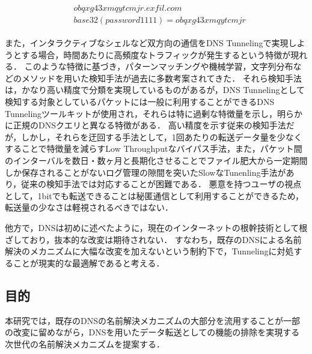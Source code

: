 \documentclass[12pt]{jarticle} %
\begin{document}
\begin{eqnarray}
 \label{eq:sample_qname}
 \begin{aligned}
  &obqxg43xmqytcmjr.exfil.com\\
  &base32(password1111) = obqxg43xmqytcmjr
 \end{aligned}
\end{eqnarray}

また，インタラクティブなシェルなど双方向の通信をDNS Tunnelingで実現しようとする場合，時間あたりに高頻度なトラフィックが発生するという特徴が現れる．
このような特徴に基づき，パターンマッチングや機械学習，文字列分布などのメソッドを用いた検知手法が過去に多数考案されてきた\cite{born, cheng, liu, asaf, steadman, jawad}．
それら検知手法は，かなり高い精度で分類を実現しているものがあるが，DNS Tunnelingとして検知する対象としているパケットには一般に利用することができるDNS Tunnelingツールキット\cite{ozymandns, iodine, dnscat2}が使用され，それらは特に過剰な特徴量を示し，明らかに正規のDNSクエリと異なる特徴がある．
高い精度を示す従来の検知手法だが，しかし，それらを迂回する手法として，1回あたりの転送データ量を少なくすることで特徴量を減らすLow Throughputなバイパス手法，また，パケット間のインターバルを数日・数ヶ月と長期化させることでファイル肥大から一定期間しか保存されることがないログ管理の隙間を突いたSlowなTunenling手法があり，従来の検知手法では対応することが困難である．
悪意を持つユーザの視点として，1bitでも転送できることは秘匿通信として利用することができるため，転送量の少なさは軽視されるべきではない．

他方で，DNSは初めに述べたように，現在のインターネットの根幹技術として根ざしており，抜本的な改変は期待されない．
すなわち，既存のDNSによる名前解決のメカニズムに大幅な改変を加えないという制約下で，Tunnelingに対処することが現実的な最適解であると考える．


\subsection{目的}
本研究では，既存のDNSの名前解決メカニズムの大部分を流用することが一部の改変に留めながら，DNSを用いたデータ転送としての機能の排除を実現する次世代の名前解決メカニズムを提案する．
\end{document}
